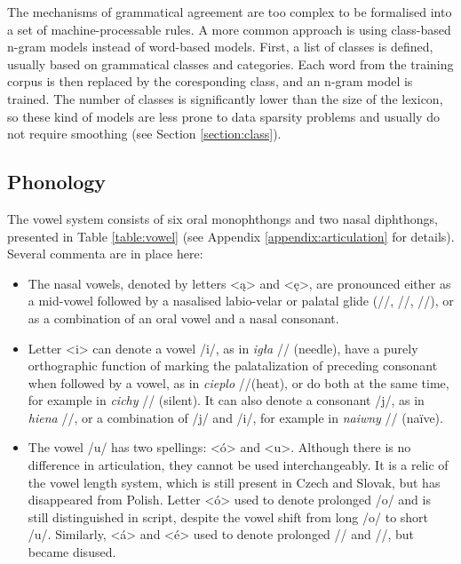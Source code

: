The mechanisms of grammatical agreement are too complex to be formalised into a set of machine-processable rules. A more common approach is using class-based n-gram models instead of word-based models. First, a list of classes is defined, usually based on grammatical classes and categories. Each word from the training corpus is then replaced by the coresponding class, and an n-gram model is trained. The number of classes is significantly lower than the size of the lexicon, so these kind of models are less prone to data sparsity problems and usually do not require smoothing (see Section \ref{section:class}).

\subsection{Phonology}
The vowel system consists of six oral monophthongs and two nasal diphthongs, presented in Table \ref{table:vowel} (see Appendix \ref{appendix:articulation} for details). Several commenta are in place here:
\begin{itemize}
\item The nasal vowels, denoted by letters <ą> and <ę>, are pronounced either as a mid-vowel followed by a nasalised labio-velar or palatal glide (//, //, //), or as a combination of an oral vowel and a nasal consonant.
\item Letter <i> can denote a vowel /i/, as in \textit{igła} // (needle), have a purely orthographic function of marking the palatalization of preceding consonant when followed by a vowel, as in \textit{cieplo} //(heat), or do both at the same time, for example in \textit{cichy} // (silent). It can also denote a consonant /j/, as in \textit{hiena} //, or a combination of /j/ and /i/, for example in \textit{naiwny} // (naïve).
\item The vowel /u/ has two spellings: <ó> and <u>. Although there is no difference in articulation, they cannot be used interchangeably. It is a relic of the vowel length system, which is still present in Czech and Slovak, but has disappeared from Polish. Letter <ó> used to denote prolonged /o/ and is still distinguished in script, despite the vowel shift from long /o/ to short /u/. Similarly, <á> and <é> used to denote prolonged // and //, but became disused.
\end{itemize}

